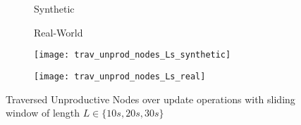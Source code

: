 \documentclass[abstracton,12pt]{scrartcl}
\theoremstyle{definition}
\begin{document}



\begin{figure}[h]
  \centering
  \begin{subfigure}{0.49\linewidth}
    \centering
    Synthetic
  \end{subfigure}
  \begin{subfigure}{0.49\linewidth}
    \centering
    Real-World
  \end{subfigure}
  \begin{subfigure}{0.49\linewidth}
    \centering
    \texttt{[image: trav\_unprod\_nodes\_Ls\_synthetic]}
    \caption{}
    \label{fig:trav_unprod_nodes_Ls_synthetic}
  \end{subfigure}
  \begin{subfigure}{0.49\linewidth}
    \centering
    \texttt{[image: trav\_unprod\_nodes\_Ls\_real]}
    \caption{}
    \label{fig:trav_unprod_nodes_Ls_real}
  \end{subfigure}
  \caption{Traversed Unproductive Nodes over update operations with sliding 
  window of length $L \in \{10s,20s,30s\}$}
\end{figure}
\end{document}
